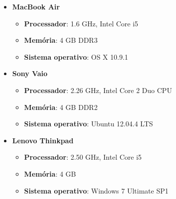 \begin{itemize}
  	\item {\textbf{MacBook Air}}
	  	\begin{itemize}
	  		\item {\textbf{Processador}: 1.6 GHz, Intel Core i5}
	  		\item {\textbf{Memória}: 4 GB DDR3}
	  		\item {\textbf{Sistema operativo}: OS X 10.9.1}
	  	\end{itemize}
  	\item {\textbf{Sony Vaio}}
  		\begin{itemize}
  			\item {\textbf{Processador}: 2.26 GHz, Intel Core 2 Duo CPU}
  			\item {\textbf{Memória}: 4 GB DDR2}
  			\item {\textbf{Sistema operativo}: Ubuntu 12.04.4 LTS}
  		\end{itemize}
  	\item {\textbf{Lenovo Thinkpad}}
  		\begin{itemize}
	  		\item {\textbf{Processador}: 2.50 GHz, Intel Core i5}
	  		\item {\textbf{Memória}: 4 GB}
	  		\item {\textbf{Sistema operativo}: Windows 7 Ultimate SP1}
  		\end{itemize}
\end{itemize}